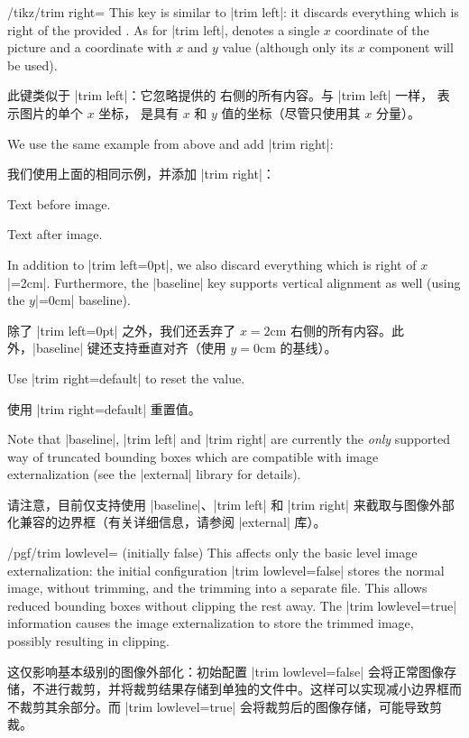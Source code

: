 \begin{key}{/tikz/trim right=}
    This key is similar to |trim left|: it discards everything which is right
    of the provided . As for |trim left|,
     denotes a single $x$ coordinate of the picture and
     a coordinate with $x$ and $y$ value (although only its
    $x$ component will be used).

    此键类似于 |trim left|：它忽略提供的  右侧的所有内容。与 |trim left| 一样， 表示图片的单个 $x$ 坐标， 是具有 $x$ 和 $y$ 值的坐标（尽管只使用其 $x$ 分量）。



    We use the same example from above and add |trim right|:
    
    我们使用上面的相同示例，并添加 |trim right|：

\begin{codeexample}[]
Text before image.%
Text after image.
\end{codeexample}
    In addition to |trim left=0pt|, we also discard everything which is right
    of $x$|=2cm|. Furthermore, the |baseline| key supports vertical alignment
    as well (using the $y$|=0cm| baseline).

    除了 |trim left=0pt| 之外，我们还丢弃了 $x=2\mathrm{cm}$ 右侧的所有内容。此外，|baseline| 键还支持垂直对齐（使用 $y=0\mathrm{cm}$ 的基线）。


    Use |trim right=default| to reset the value.

    使用 |trim right=default| 重置值。

\end{key}

Note that |baseline|, |trim left| and |trim right| are currently the
\emph{only} supported way of truncated bounding boxes which are compatible with
image externalization (see the |external| library for details).

请注意，目前仅支持使用 |baseline|、|trim left| 和 |trim right| 来截取与图像外部化兼容的边界框（有关详细信息，请参阅 |external| 库）。

\begin{key}{/pgf/trim lowlevel= (initially false)}
    This affects only the basic level image externalization: the initial
    configuration |trim lowlevel=false| stores the normal image, without
    trimming, and the trimming into a separate file. This allows reduced
    bounding boxes without clipping the rest away. The |trim lowlevel=true|
    information causes the image externalization to store the trimmed image,
    possibly resulting in clipping.

    这仅影响基本级别的图像外部化：初始配置 |trim lowlevel=false| 会将正常图像存储，不进行裁剪，并将裁剪结果存储到单独的文件中。这样可以实现减小边界框而不裁剪其余部分。而 |trim lowlevel=true| 会将裁剪后的图像存储，可能导致剪裁。
\end{key}


